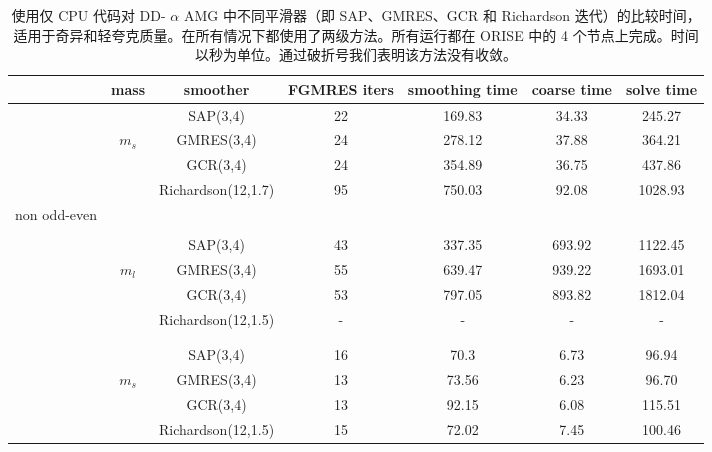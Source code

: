 \documentclass[5p,times,a4paper,fleqn]{cas-dc}
\begin{document}
   \begin{table}[h]
    \centering
    \caption{使用仅 CPU 代码对 DD-   $\alpha$    AMG 中不同平滑器（即 SAP、GMRES、GCR 和 Richardson 迭代）的比较时间，适用于奇异和轻夸克质量。在所有情况下都使用了两级方法。所有运行都在 ORISE 中的 4 个节点上完成。时间以秒为单位。通过破折号我们表明该方法没有收敛。  }
   \label{tab:smoothers_cpu_only_comparison}
   \begin{tabular}{ccccccc}
     \hline
      & mass                     & smoother       & FGMRES iters & smoothing time & coarse time & solve time   \\  \hline
      &                          & SAP(3,4)       & 22           & 169.83         & 34.33       & 245.27       \\ 
      & \multirow{2}{*}{        $m_{s}$        } & GMRES(3,4)     & 24           & 278.12         & 37.88       & 364.21       \\ 
      &                          & GCR(3,4)       & 24           & 354.89         & 36.75       & 437.86       \\ 
      &                          & Richardson(12,1.7) & 95          & 750.03         & 92.08        & 1028.93       \\ 
     non odd-even &&&&&& \\ [-1.5ex]
     \cline{2-7}
     &&&&&& \\ [-1.5ex]
      &                          & SAP(3,4)       & 43   & 337.35 & 693.92 & 1122.45  \\ 
      & \multirow{2}{*}{        $m_{l}$        } & GMRES(3,4)     & 55   & 639.47 & 939.22 & 1693.01  \\ 
      &                          & GCR(3,4)       & 53   & 797.05 & 893.82 & 1812.04  \\ 
      &                          & Richardson(12,1.5) & -    & -      & -      & -        \\ 
          &&&&&& \\ [-1.5ex]
          \hline
          &&&&&& \\ [-1.5ex]
          &                           & SAP(3,4)       & 16  & 70.3   & 6.73  & 96.94   \\ 
          &  \multirow{2}{*}{        $m_{s}$        } & GMRES(3,4)     & 13  & 73.56  & 6.23  & 96.70   \\ 
          &                           & GCR(3,4)       & 13  & 92.15  & 6.08  & 115.51  \\           
          &         & Richardson(12,1.5) & 15   & 72.02  & 7.45 & 100.46       \\   

\end{tabular}
\end{table}
\end{document}
